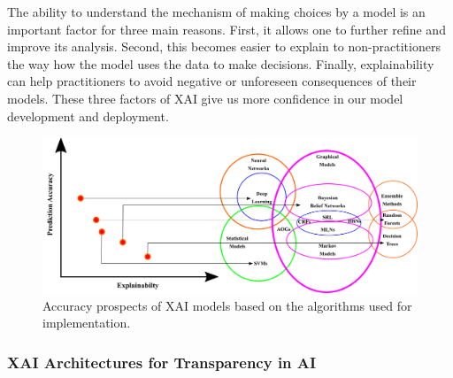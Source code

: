 \documentclass[journal]{IEEEtran}
\begin{document}
The ability to understand the mechanism of making choices by a model is an important factor for three main reasons. First, it allows one to further refine and improve its analysis. Second, this becomes easier to explain to non-practitioners the way how the model uses the data to make decisions. Finally, explainability can help practitioners to avoid negative or unforeseen consequences of their models. These three factors of XAI give us more confidence in our model development and deployment.

\begin{figure}
  \centering \includegraphics[width=\textwidth]{figures/Accuracy.png}
   \caption{Accuracy prospects of XAI models based on the algorithms used for implementation.}
   \label{fig:Accuracy}
\end{figure}
\subsubsection{XAI Architectures for Transparency in AI}
\end{document}
